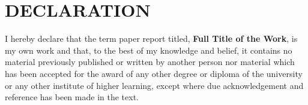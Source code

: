 \chapter*{DECLARATION}
I hereby declare that the term paper report titled, \textbf{Full Title of the 
Work}, is my own work and that, to the best of my knowledge and belief, it 
contains no material previously published or written by another person nor 
material which has been accepted for the award of any other degree or diploma of 
the university or any other institute of higher learning, except where due 
acknowledgement and reference has been made in the text.\\

\vspace{2cm}
\newpage 
